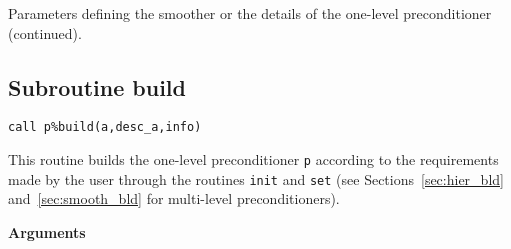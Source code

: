 \begin{center}
\begin{tabular}{|p{3cm}|l|p{2.5cm}|p{2.2cm}|p{7.1cm}|}
\hline
\end{tabular}
\end{center}
\caption{Parameters defining the smoother or the details of the one-level preconditioner
(continued).\label{tab:p_smoother_1}}  
\esideways

\clearpage

\subsection{Subroutine build\label{sec:precbld}}
  
\begin{center}
\verb|call p%build(a,desc_a,info)|\\
\end{center}

\noindent
This routine builds the one-level preconditioner \verb|p| according to the requirements
made by the user through the routines \verb|init| and \verb|set|
(see Sections~\ref{sec:hier_bld} and~\ref{sec:smooth_bld} for multi-level preconditioners).

{\baselineskip\noindent\large\bfseries Arguments} \smallskip

